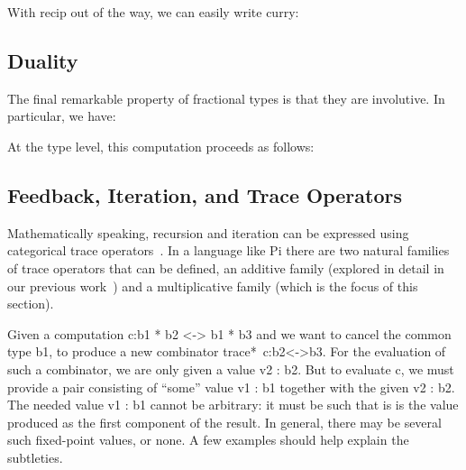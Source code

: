 \documentclass{llncs}
\newcommand{\dgm}[2][1.5]{
\begin{center}
\scalebox{#1}{
\texttt{[image: diagrams/\#2.pdf]}
}
\end{center}
}
\begin{document}
With {{recip}} out of the way, we can easily write {{curry}}:


\subsection{Duality}

The final remarkable property of fractional types is that they
are involutive.  In particular, we have:


\dgm{involution-times}

\noindent At the type level, this computation proceeds as follows:


\subsection{Feedback, Iteration, and Trace Operators}

Mathematically speaking, recursion and iteration can be expressed using
categorical trace
operators~\cite{joyal1996traced,Hasegawa:1997:RCS:645893.671607}.  In a
language like {{Pi}} there are two natural families of trace operators
that can be defined, an additive family (explored in detail in our previous
work~\cite{rc2011}) and a multiplicative family (which is the focus of this
section).

Given a computation {{c:b1 * b2 <-> b1 * b3}} and we
want to cancel the common type {{b1}}, to produce a new combinator
{{trace*~c:b2<->b3}}. For the evaluation of such a combinator, we are only
given a value {{v2 : b2}}. But to evaluate {{c}}, we must provide a pair
consisting of ``some'' value {{v1 : b1}} together with the given {{v2 : b2}}.
The needed value {{v1 : b1}} cannot be arbitrary: it must be such that is
is the value produced as the first component of the result.  In general, there
may be several such fixed-point values, or none.  A few examples should help
explain the subtleties.
\end{document}
